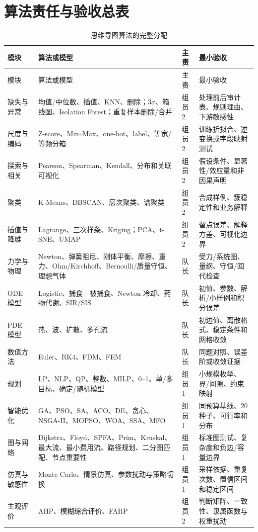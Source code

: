 \section{算法责任与验收总表}

\begin{longtable}{p{2.1cm}p{5.0cm}p{2.0cm}p{5.5cm}}
\caption{思维导图算法的完整分配}\label{tab:algorithm-owner}\\
\toprule
模块 & 算法或模型 & 主责 & 最小验收\\
\midrule
\endfirsthead
\toprule
模块 & 算法或模型 & 主责 & 最小验收\\
\midrule
\endhead
缺失与异常 & 均值/中位数、插值、KNN、删除；$3\sigma$、箱线图、Isolation Forest；重复样本删除/合并 & 组员2 & 处理前后审计表、规则理由、下游敏感性\\
尺度与编码 & Z-score、Min--Max、one-hot、label、等宽/等频分箱 & 组员2 & 训练折拟合、逆变换或字段映射测试\\
探索与相关 & Pearson、Spearman、Kendall、分布和关联可视化 & 组员2 & 假设条件、显著性/效应量和非因果声明\\
聚类 & K-Means、DBSCAN、层次聚类、谱聚类 & 组员2 & 合成样例、簇稳定性和业务解释\\
插值与降维 & Lagrange、三次样条、Kriging；PCA、t-SNE、UMAP & 组员2 & 留点误差、解释方差、可视化边界\\
力学与物理 & Newton、弹簧阻尼、刚体平衡、摩擦、重力、Ohm/Kirchhoff、Bernoulli/质量守恒、理想气体 & 队长 & 受力/系统图、量纲、守恒/回代检查\\
ODE 模型 & Logistic、捕食—被捕食、Newton 冷却、药物代谢、SIR/SIS & 队长 & 初值、参数、解析/小样例和积分误差\\
PDE 模型 & 热、波、扩散、多孔流 & 队长 & 初边值、离散格式、稳定条件和网格收敛\\
数值方法 & Euler、RK4、FDM、FEM & 队长 & 同题对照、误差阶或收敛证据\\
规划 & LP、NLP、QP、整数、MILP、0--1、单/多目标、确定/随机模型 & 组员1 & 小规模枚举、界/间隙、约束映射\\
智能优化 & GA、PSO、SA、ACO、DE、贪心、NSGA-II、MOPSO、WOA、SSA、MFO & 组员1 & 同预算基线、20 种子、可行率和分布\\
图与网络 & Dijkstra、Floyd、SPFA、Prim、Kruskal、最大流、最小费用流、路径规划、二分图匹配、节点重要性 & 组员1 & 标准图测试、复杂度和负边/容量边界\\
仿真与敏感性 & Monte Carlo、情景仿真、参数扰动与策略切换 & 组员1 & 采样依据、重复次数、置信区间和稳定区间\\
主观评价 & AHP、模糊综合评价、FAHP & 组员2 & 判断矩阵、一致性、隶属函数与权重扰动\\

\end{longtable}
